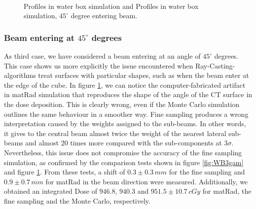 \documentclass[12pt, a4paper, twoside]{book}
\begin{document}
\begin{figure}[!h]
\centering
{} 
 \\
\caption{Profiles in water box simulation and Profiles in water box simulation,  $45^\circ$ degree entering beam.}
\label{fig:WB3prof}
\end{figure}


\subsubsection{Beam entering at $45^\circ$ degrees}
As third case, we have considered a beam entering at an angle of $45^\circ$ degrees. This case shows us more explicitly the issue encountered when Ray-Casting-algorithms treat surfaces with particular shapes, such as when the beam enter at the edge of the cube. In figure \ref{fig:WB3prof}, we can notice the computer-fabricated artifact in matRad simulation that reproduces the shape of the angle of the CT surface in the dose deposition. This is clearly wrong, even if the Monte Carlo simulation outlines the same behaviour in a smoother way. Fine sampling produces a wrong interpretation caused by the weights assigned to the sub-beams. In other words, it gives to the central beam almost twice the weight of the nearest lateral sub-beams and almost 20 times more compared with the sub-components at $3\sigma$.
Nevertheless, this issue does not compromise the accuracy of the fine sampling simulation, as confirmed by the comparison tests shown in figure \ref{fig:WB3gam} and figure \ref{fig:WB3prof}. From these tests, a shift of $0.3\pm0.3\,mm$ for the fine sampling and $0.9\pm0.7\,mm$ for matRad in the beam direction were measured. Additionally, we obtained an integrated Dose of $946.8$, $940.3$ and $951.5\pm10.7\,cGy$ for matRad, the fine sampling and the Monte Carlo, respectively.
\end{document}

